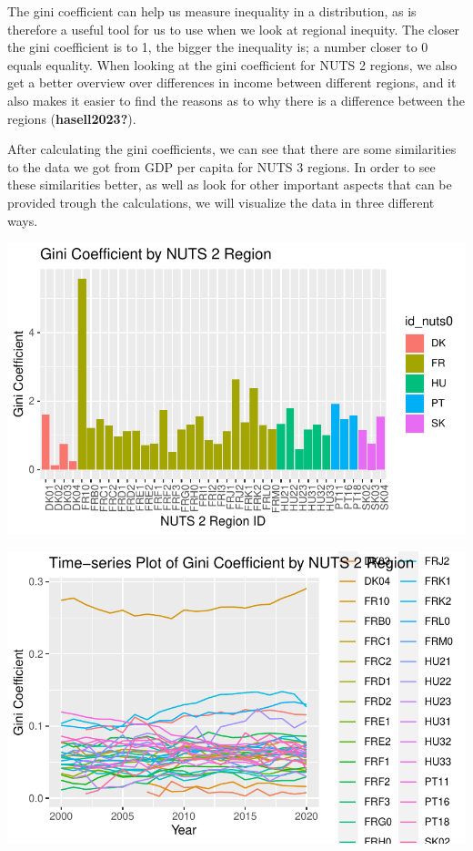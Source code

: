 \documentclass[
  a4paper,
  DIV=11,
  numbers=noendperiod]{scrartcl}
\begin{document}
The gini coefficient can help us measure inequality in a distribution,
as is therefore a useful tool for us to use when we look at regional
inequity. The closer the gini coefficient is to 1, the bigger the
inequality is; a number closer to 0 equals equality. When looking at the
gini coefficient for NUTS 2 regions, we also get a better overview over
differences in income between different regions, and it also makes it
easier to find the reasons as to why there is a difference between the
regions (\textbf{hasell2023?}).

After calculating the gini coefficients, we can see that there are some
similarities to the data we got from GDP per capita for NUTS 3 regions.
In order to see these similarities better, as well as look for other
important aspects that can be provided trough the calculations, we will
visualize the data in three different ways.

\includegraphics{MSB104_GR_1_Final_Assignment_research_article_files/figure-pdf/unnamed-chunk-23-1.pdf}

\includegraphics{MSB104_GR_1_Final_Assignment_research_article_files/figure-pdf/unnamed-chunk-24-1.pdf}
\end{document}
